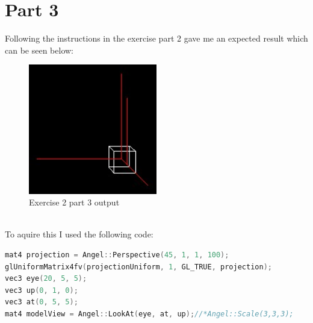 \section{Part 3}
Following the instructions in the exercise part 2 gave me an expected result which can be seen below:
\begin{figure}[ht!]
	\begin{center}
		\includegraphics[width=0.5\textwidth]{figures/exercise_2_part_3}
	\end{center}
	\caption{Exercise 2 part 3 output}
	\label{fig:exercise_2_part_3} 
\end{figure} \\
To aquire this I used the following code:
\begin{lstlisting}[language=cpp, caption={Front perspective projection}]
mat4 projection = Angel::Perspective(45, 1, 1, 100);
glUniformMatrix4fv(projectionUniform, 1, GL_TRUE, projection);
vec3 eye(20, 5, 5);
vec3 up(0, 1, 0);
vec3 at(0, 5, 5);
mat4 modelView = Angel::LookAt(eye, at, up);//*Angel::Scale(3,3,3);
\end{lstlisting}
\clearpage


